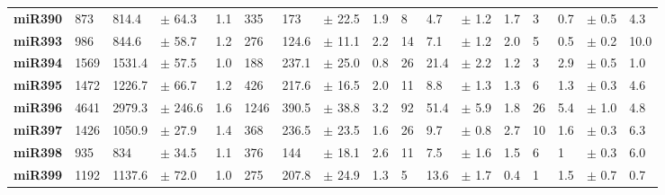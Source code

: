 \begin{landscape}
\begin{table}[]
\begin{tabular}{lllllllllllllllll}
\textbf{miR390}      & 873            & 814.4             & $\pm$  64.3      & 1.1            & 335            & 173               & $\pm$  22.5      & 1.9            & 8              & 4.7               & $\pm$  1.2       & 1.7            & 3              & 0.7               & $\pm$  0.5       & 4.3            \\
\textbf{miR393}      & 986            & 844.6             & $\pm$  58.7      & 1.2            & 276            & 124.6             & $\pm$  11.1      & 2.2            & 14             & 7.1               & $\pm$  1.2       & 2.0            & 5              & 0.5               & $\pm$  0.2       & 10.0           \\
\textbf{miR394}      & 1569           & 1531.4            & $\pm$  57.5      & 1.0            & 188            & 237.1             & $\pm$  25.0      & 0.8            & 26             & 21.4              & $\pm$  2.2       & 1.2            & 3              & 2.9               & $\pm$  0.5       & 1.0            \\
\textbf{miR395}      & 1472           & 1226.7            & $\pm$  66.7      & 1.2            & 426            & 217.6             & $\pm$  16.5      & 2.0            & 11             & 8.8               & $\pm$  1.3       & 1.3            & 6              & 1.3               & $\pm$  0.3       & 4.6            \\
\textbf{miR396}      & 4641           & 2979.3            & $\pm$  246.6     & 1.6            & 1246           & 390.5             & $\pm$  38.8      & 3.2            & 92             & 51.4              & $\pm$  5.9       & 1.8            & 26             & 5.4               & $\pm$  1.0       & 4.8            \\
\textbf{miR397}      & 1426           & 1050.9            & $\pm$  27.9      & 1.4            & 368            & 236.5             & $\pm$  23.5      & 1.6            & 26             & 9.7               & $\pm$  0.8       & 2.7            & 10             & 1.6               & $\pm$  0.3       & 6.3            \\
\textbf{miR398}      & 935            & 834               & $\pm$  34.5      & 1.1            & 376            & 144               & $\pm$  18.1      & 2.6            & 11             & 7.5               & $\pm$  1.6       & 1.5            & 6              & 1                 & $\pm$  0.3       & 6.0            \\
\textbf{miR399}      & 1192           & 1137.6            & $\pm$  72.0      & 1.0            & 275            & 207.8             & $\pm$  24.9      & 1.3            & 5              & 13.6              & $\pm$  1.7       & 0.4            & 1              & 1.5               & $\pm$  0.7       & 0.7            \\

\end{tabular}
\end{table}
\end{landscape}
